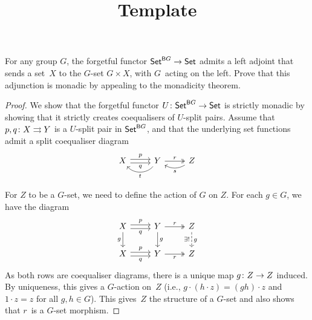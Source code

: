 \documentclass[../../solutions]{subfiles}
\title{Template}
\author{}
\begin{document}
\maketitle

%   

\begin{exercise}
  For any group $G$, the forgetful functor $\mathsf{Set}^{{\mathsf{B}} G}\to\mathsf{Set}$
  admits a left adjoint that sends a set~$X$ to the $G$-set
  $G\times X$, with $G$~acting on the left.  Prove that this
  adjunction is monadic by appealing to the monadicity theorem.
\end{exercise}

\begin{proof}
  We show that the forgetful functor $\func{U}{\Set^{\sB G}}{\Set}$ is
  strictly monadic by showing that it strictly creates coequalisers of
  $U$-split pairs.  Assume that ${p,q}\colon{X}\rightrightarrows{Y}$ is a $U$-split
  pair in $\mathsf{Set}^{{\mathsf{B}} G}$, and that the underlying set functions admit
  a split coequaliser diagram
  $$
  \begin{tikzcd}
    X
    \ar[r, shift left=0.5ex, "p"]
    \ar[r, shift right=0.5ex, "q"']
    & Y
    \ar[r, twoheadrightarrow, "r"]
    \ar[l, bend left=50, "t"]
    & Z
    \ar[l, bend left=30, "s"]
  \end{tikzcd}
  $$

  For $Z$ to be a $G$-set, we need to define the action of $G$ on
  $Z$.  For each $g\in G$, we have the diagram
  $$
  \begin{tikzcd}
    X
    \ar[r, shift left=0.5ex, "p"]
    \ar[r, shift right=0.5ex, "q"']
    \ar[d, "g"']
    & Y
    \ar[r, twoheadrightarrow, "r"]
    \ar[d, "g"]
    & Z
    \ar[d, dashed, "\exists!\vphantom{g}"', "g\vphantom{!}"]
    \\
    X
    \ar[r, shift left=0.5ex, "p"]
    \ar[r, shift right=0.5ex, "q"']
    & Y
    \ar[r, twoheadrightarrow, "r"']
    & Z    
  \end{tikzcd}
  $$
  As both rows are coequaliser diagrams, there is a unique map
  ${g}\colon{Z}\to{Z}$ induced.  By uniqueness, this gives a $G$-action
  on~$Z$ (i.e., $g\cdot(h\cdot z)=(gh)\cdot z$ and $1\cdot z=z$ for
  all $g,h\in G$).  This gives~$Z$ the structure of a $G$-set and also
  shows that $r$~is a $G$-set morphism.


\end{proof}
\end{document}
